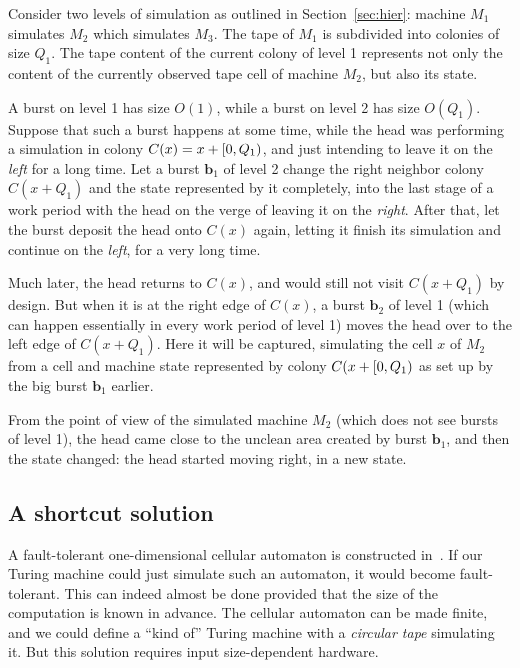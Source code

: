 \documentclass[12pt]{memoir}
\begin{document}
\begin{example}[Uncleanness]
Consider two levels of simulation as outlined in Section~\ref{sec:hier}: 
machine \( M_{1} \) simulates \( M_{2} \) which simulates \( M_{3} \).
The tape of \( M_{1} \) is subdivided into colonies of size \( Q_{1} \).
The tape content of the 
current colony of level 1 represents not only the content of the currently
observed tape cell of machine \( M_{2} \), but also its state.

A burst on level 1 has size \( O(1) \), while a burst on level 2 has size \( O(Q_{1}) \).
Suppose that such a burst happens at some time, while the head was
performing a simulation in colony \( C(x)=x+\left[0,Q_{1}\right) \),
and just intending to leave it on the \emph{left} for a long time.
Let a burst \( \mathbf{b}_{1} \) of level 2 change the right neighbor colony \( C(x+Q_{1}) \) 
and the state represented by it 
completely, into the last stage of a work period with the 
head on the verge of leaving it on the \emph{right}.
After that, let the burst deposit the head onto \( C(x) \) again, letting it finish
its simulation and continue on the \emph{left}, for a very long time.

Much later, the head returns to \( C(x) \), and would still not visit \( C(x+Q_{1}) \) by
design.
But when it is at the right edge of \( C(x) \),
a burst \( \mathbf{b}_{2} \) of level 1 (which can happen essentially in every work period of level 1)
moves the head over to the left edge of \( C(x+Q_{1}) \).
Here it will be captured, simulating the cell \( x \) of \( M_{2} \) from a cell and machine state 
represented by colony \( C(x+\left[0,Q_{1}\right) \) as set up by 
the big burst \( \mathbf{b}_{1} \) earlier.

From the point of view of the simulated machine \( M_{2} \) (which does not see bursts
of level 1), the head came close to the unclean area created by burst \( \mathbf{b}_{1} \), and then 
the state changed: the head started moving right, in a new state.
\end{example}


\subsection{A shortcut solution}

A fault-tolerant one-dimensional cellular automaton is constructed
in~\cite{GacsSorg01}.
If our Turing machine could just simulate such an automaton, it would become
fault-tolerant.
This can indeed almost be done provided that the size of the computation is known in advance.
The cellular automaton can be made finite, and we could define
a ``kind of'' Turing machine with a \emph{circular tape} simulating it.
But this solution requires input size-dependent hardware.
\end{document}
